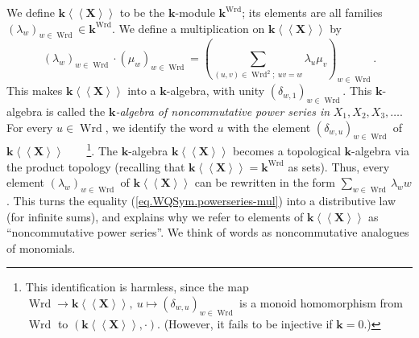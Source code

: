 \documentclass[numbers=enddot,12pt,final,onecolumn,notitlepage,abstracton]{scrartcl}%
\theoremstyle{definition}
\let\sumnonlimits\sum
\renewcommand{\sum}{\sumnonlimits\limits}
\begin{document}
We define $\mathbf{k}\left\langle \left\langle \mathbf{X}\right\rangle
\right\rangle $ to be the $\mathbf{k}$-module $\mathbf{k}^{\operatorname*{Wrd}%
}$; its elements are all families $\left(  \lambda_{w}\right)  _{w\in
\operatorname*{Wrd}}\in\mathbf{k}^{\operatorname*{Wrd}}$. We define a
multiplication on\textbf{ }$\mathbf{k}\left\langle \left\langle \mathbf{X}%
\right\rangle \right\rangle $ by
\begin{equation}
\left(  \lambda_{w}\right)  _{w\in\operatorname*{Wrd}}\cdot\left(  \mu
_{w}\right)  _{w\in\operatorname*{Wrd}}=\left(  \sum_{\left(  u,v\right)
\in\operatorname*{Wrd}\nolimits^{2};\ uv=w}\lambda_{u}\mu_{v}\right)
_{w\in\operatorname*{Wrd}}. \label{eq.WQSym.powerseries-mul}%
\end{equation}
This makes $\mathbf{k}\left\langle \left\langle \mathbf{X}\right\rangle
\right\rangle $ into a $\mathbf{k}$-algebra, with unity $\left(  \delta
_{w,1}\right)  _{w\in\operatorname*{Wrd}}$. This $\mathbf{k}$-algebra is
called the $\mathbf{k}$\textit{-algebra of noncommutative power series in
}$X_{1},X_{2},X_{3},\ldots$. For every $u\in\operatorname*{Wrd}$, we identify
the word $u$ with the element $\left(  \delta_{w,u}\right)  _{w\in
\operatorname*{Wrd}}$ of $\mathbf{k}\left\langle \left\langle \mathbf{X}%
\right\rangle \right\rangle $\ \ \ \ \footnote{This identification is
harmless, since the map $\operatorname*{Wrd}\rightarrow\mathbf{k}\left\langle
\left\langle \mathbf{X}\right\rangle \right\rangle ,\ u\mapsto\left(
\delta_{w,u}\right)  _{w\in\operatorname*{Wrd}}$ is a monoid homomorphism from
$\operatorname*{Wrd}$ to $\left(  \mathbf{k}\left\langle \left\langle
\mathbf{X}\right\rangle \right\rangle ,\cdot\right)  $. (However, it fails to
be injective if $\mathbf{k}=0$.)}. The $\mathbf{k}$-algebra $\mathbf{k}%
\left\langle \left\langle \mathbf{X}\right\rangle \right\rangle $ becomes a
topological $\mathbf{k}$-algebra via the product topology (recalling that
$\mathbf{k}\left\langle \left\langle \mathbf{X}\right\rangle \right\rangle
=\mathbf{k}^{\operatorname*{Wrd}}$ as sets). Thus, every element $\left(
\lambda_{w}\right)  _{w\in\operatorname*{Wrd}}$ of $\mathbf{k}\left\langle
\left\langle \mathbf{X}\right\rangle \right\rangle $ can be rewritten in the
form $\sum_{w\in\operatorname*{Wrd}}\lambda_{w}w$. This turns the equality
(\ref{eq.WQSym.powerseries-mul}) into a distributive law (for infinite sums),
and explains why we refer to elements of $\mathbf{k}\left\langle \left\langle
\mathbf{X}\right\rangle \right\rangle $ as \textquotedblleft noncommutative
power series\textquotedblright. We think of words as noncommutative analogues
of monomials.
\end{document}

